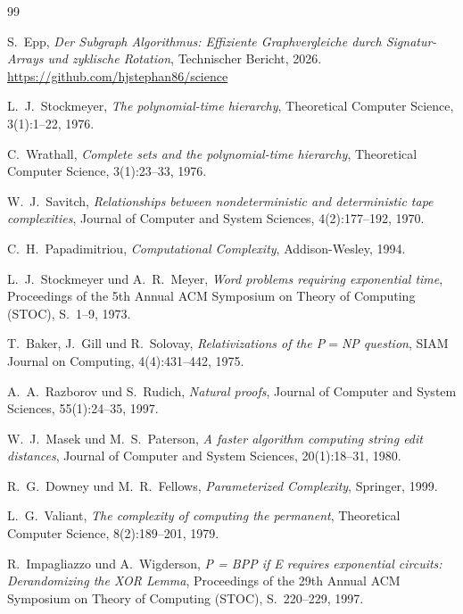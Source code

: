 ﻿\documentclass[a4paper,12pt]{article}
\theoremstyle{definition}
\begin{document}
\newpage
\begin{thebibliography}{99}

  S.~Epp,
  \textit{Der Subgraph Algorithmus: Effiziente Graphvergleiche durch Signatur-Arrays
          und zyklische Rotation},
  Technischer Bericht, 2026.
  \url{https://github.com/hjstephan86/science}

  L.~J.~Stockmeyer,
  \textit{The polynomial-time hierarchy},
  Theoretical Computer Science, 3(1):1--22, 1976.

  C.~Wrathall,
  \textit{Complete sets and the polynomial-time hierarchy},
  Theoretical Computer Science, 3(1):23--33, 1976.

  W.~J.~Savitch,
  \textit{Relationships between nondeterministic and deterministic tape complexities},
  Journal of Computer and System Sciences, 4(2):177--192, 1970.

  C.~H.~Papadimitriou,
  \textit{Computational Complexity},
  Addison-Wesley, 1994.

  L.~J.~Stockmeyer und A.~R.~Meyer,
  \textit{Word problems requiring exponential time},
  Proceedings of the 5th Annual ACM Symposium on Theory of Computing (STOC),
  S.~1--9, 1973.

  T.~Baker, J.~Gill und R.~Solovay,
  \textit{Relativizations of the P$=$NP question},
  SIAM Journal on Computing, 4(4):431--442, 1975.

  A.~A.~Razborov und S.~Rudich,
  \textit{Natural proofs},
  Journal of Computer and System Sciences, 55(1):24--35, 1997.

  W.~J.~Masek und M.~S.~Paterson,
  \textit{A faster algorithm computing string edit distances},
  Journal of Computer and System Sciences, 20(1):18--31, 1980.

  R.~G.~Downey und M.~R.~Fellows,
  \textit{Parameterized Complexity},
  Springer, 1999.

  L.~G.~Valiant,
  \textit{The complexity of computing the permanent},
  Theoretical Computer Science, 8(2):189--201, 1979.

  R.~Impagliazzo und A.~Wigderson,
  \textit{P = BPP if E requires exponential circuits: Derandomizing the XOR Lemma},
  Proceedings of the 29th Annual ACM Symposium on Theory of Computing (STOC),
  S.~220--229, 1997.


\end{thebibliography}
\end{document}
